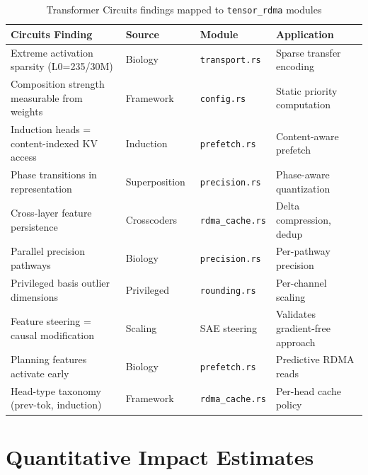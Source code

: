 \documentclass[11pt,letterpaper]{article}
\begin{document}
\begin{table}[htbp]
\centering
\caption{Transformer Circuits findings mapped to \texttt{tensor\_rdma} modules}
\label{tab:mapping}
\footnotesize
\begin{tabular}{@{}p{3.8cm}p{3cm}p{2.5cm}p{3.5cm}@{}}
\toprule
\textbf{Circuits Finding} & \textbf{Source} & \textbf{Module} & \textbf{Application} \\
\midrule
Extreme activation sparsity (L0=235/30M) & Biology~\cite{lindsey2025biology} & \texttt{transport.rs} & Sparse transfer encoding \\
Composition strength measurable from weights & Framework~\cite{elhage2021framework} & \texttt{config.rs} & Static priority computation \\
Induction heads = content-indexed KV access & Induction~\cite{olsson2022induction} & \texttt{prefetch.rs} & Content-aware prefetch \\
Phase transitions in representation & Superposition~\cite{elhage2022superposition} & \texttt{precision.rs} & Phase-aware quantization \\
Cross-layer feature persistence & Crosscoders~\cite{anthropic2024crosscoders} & \texttt{rdma\_cache.rs} & Delta compression, dedup \\
Parallel precision pathways & Biology~\cite{lindsey2025biology} & \texttt{precision.rs} & Per-pathway precision \\
Privileged basis outlier dimensions & Privileged~\cite{anthropic2023privileged} & \texttt{rounding.rs} & Per-channel scaling \\
Feature steering = causal modification & Scaling~\cite{templeton2024scaling} & SAE steering & Validates gradient-free approach \\
Planning features activate early & Biology~\cite{lindsey2025biology} & \texttt{prefetch.rs} & Predictive RDMA reads \\
Head-type taxonomy (prev-tok, induction) & Framework~\cite{elhage2021framework} & \texttt{rdma\_cache.rs} & Per-head cache policy \\
\bottomrule
\end{tabular}
\end{table}

\section{Quantitative Impact Estimates}
\label{sec:impact}
\end{document}
